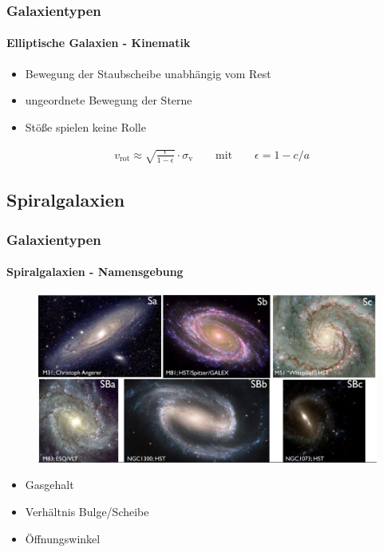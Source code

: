 \begin{frame}
\frametitle{Galaxientypen}
\framesubtitle{Elliptische Galaxien - Kinematik}

\begin{itemize}
\item Bewegung der Staubscheibe unabhängig vom Rest
\item ungeordnete Bewegung der Sterne
\item Stöße spielen keine Rolle
\end{itemize}


\begin{align*}
&v_{\text{rot}} \approx \sqrt{\frac{\epsilon}{1 - \epsilon}} \cdot \sigma_{\text{v}} \qquad \text{mit} \qquad \epsilon = 1 - c/a
\end{align*}

\end{frame}


\subsection{Spiralgalaxien}

\begin{frame}
\frametitle{Galaxientypen}
\framesubtitle{Spiralgalaxien - Namensgebung}

\begin{figure}
\includegraphics[scale=0.25]{Spiral_Namensgebung.jpg}
\end{figure}

\begin{itemize}
\item Gasgehalt
\item Verhältnis Bulge/Scheibe
\item Öffnungswinkel
\end{itemize}

\end{frame}


